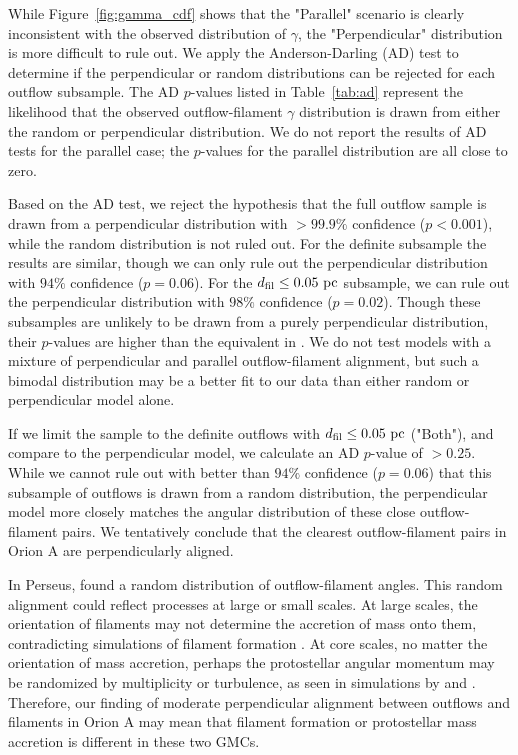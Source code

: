 \documentclass[twocolumn]{aastex63}
\begin{document}
While Figure~\ref{fig:gamma_cdf} shows that the "Parallel" scenario is clearly inconsistent with the observed distribution of $\gamma$, the "Perpendicular" distribution is more difficult to rule out. We apply the Anderson-Darling (AD) test \citep{Stephens74} to determine if the perpendicular or random distributions can be rejected for each outflow subsample. The AD $p$-values listed in Table~\ref{tab:ad} represent the likelihood that the observed outflow-filament $\gamma$ distribution is drawn from either the random or perpendicular distribution. We do not report the results of AD tests for the parallel case; the $p$-values for the parallel distribution are all close to zero.

Based on the AD test, we reject the hypothesis that the full outflow sample is drawn from a perpendicular distribution with $>99.9\%$ confidence ($p < 0.001$), while the random distribution is not ruled out. For the definite subsample the results are similar, though we can only rule out the perpendicular distribution with $94\%$ confidence ($p = 0.06$). For the $d_{\rm fil} \leq 0.05~\rm{pc}$ subsample, we can rule out the perpendicular distribution with $98\%$ confidence ($p = 0.02$). Though these subsamples are unlikely to be drawn from a purely perpendicular distribution, their $p$-values are higher than the equivalent in \citet{Stephens17}. We do not test models with a mixture of perpendicular and parallel outflow-filament alignment, but such a bimodal distribution may be a better fit to our data than either random or perpendicular model alone.

If we limit the sample to the definite outflows with $d_{\rm fil} \leq 0.05~\rm{pc}$ ("Both"), and compare to the perpendicular model, we calculate an AD $p$-value of $> 0.25$. While we cannot rule out with better than $94\%$ confidence ($p = 0.06$) that this subsample of outflows is drawn from a random distribution, the perpendicular model more closely matches the angular distribution of these close outflow-filament pairs. We tentatively conclude that the clearest outflow-filament pairs in Orion A are perpendicularly aligned.

In Perseus, \citet{Stephens17} found a random distribution of outflow-filament angles. This random alignment could reflect processes at large or small scales. At large scales, the orientation of filaments may not determine the accretion of mass onto them, contradicting simulations of filament formation \citep[e.g.][]{Chen14,Clarke17}. At core scales, no matter the orientation of mass accretion, perhaps the protostellar angular momentum may be randomized by multiplicity or turbulence, as seen in simulations by \citet{Offner16} and \citet{Lee17}. Therefore, our finding of moderate perpendicular alignment between outflows and filaments in Orion A may mean that filament formation or protostellar mass accretion is different in these two GMCs.
\end{document}

